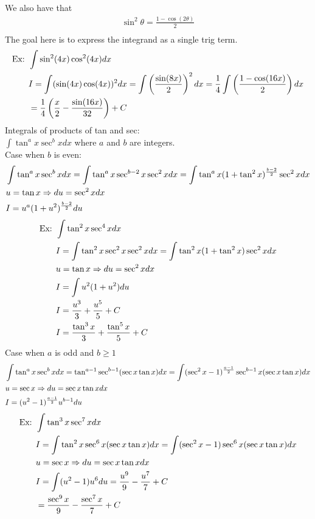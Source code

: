 \documentclass[11pt, fleqn]{article}
\begin{document}
We also have that
\begin{align*}
    \sin^2\theta=\frac{1-\cos(2\theta)}{2}\\
\end{align*}
The goal here is to express the integrand as a single trig term.
\begin{align*}
    \text{Ex: }&\int\sin^2(4x)\cos^2(4x)dx\\
    &I=\int(\sin(4x)\cos(4x))^2dx=\int\left( \frac{\sin(8x)}{2} \right)^2dx=\frac{1}{4}\int\left( \frac{1-\cos(16x)}{2} \right)dx\\
    &=\frac{1}{4}\left( \frac{x}{2}-\frac{\sin(16x)}{32} \right)+C
\end{align*}
Integrals of products of tan and sec:\\
$\int\tan^ax\sec^bxdx$ where $a$ and $b$ are integers.\\
Case when $b$ is even:
\begin{align*}
    &\int\tan^ax\sec^bxdx=\int\tan^ax\sec^{b-2}x\sec^2xdx=\int\tan^ax(1+\tan^2x)^{\frac{b-2}{2}}\sec^2xdx\\
    &u=\tan x\Rightarrow du=\sec^2xdx\\
    &I=u^a(1+u^2)^{\frac{b-2}{2}}du
\end{align*}
\begin{align*}
    \text{Ex: }&\int\tan^2x\sec^4xdx\\
    &I=\int\tan^2x\sec^2x\sec^2xdx=\int\tan^2x(1+\tan^2x)\sec^2xdx\\
    &u=\tan x\Rightarrow du=\sec^2xdx\\
    &I=\int u^2(1+u^2)du\\
    &I=\frac{u^3}{3}+\frac{u^5}{5}+C\\
    &I=\frac{\tan^3x}{3}+\frac{\tan^5x}{5}+C
\end{align*}
Case when $a$ is odd and $b\geq 1$
\begin{align*}
    &\int\tan^ax\sec^bxdx=\tan^{a-1}\sec^{b-1}(\sec x\tan x)dx=\int(\sec^2x-1)^{\frac{a-1}{2}}\sec^{b-1}x(\sec x\tan x)dx\\
    &u=\sec x\Rightarrow du=\sec x\tan xdx\\
    &I=(u^2-1)^{\frac{a-1}{2}}u^{b-1}du
\end{align*}
\begin{align*}
    \text{Ex: }&\int\tan^3x\sec^7xdx\\
    &I=\int\tan^2x\sec^6x(\sec x\tan x)dx=\int(\sec^2x-1)\sec^6x(\sec x\tan x)dx\\
    &u=\sec x\Rightarrow du=\sec x\tan x dx\\
    &I=\int(u^2-1)u^6du=\frac{u^9}{9}-\frac{u^7}{7}+C\\
    &=\frac{\sec^9x}{9}-\frac{\sec^7x}{7}+C
\end{align*}
\end{document}
